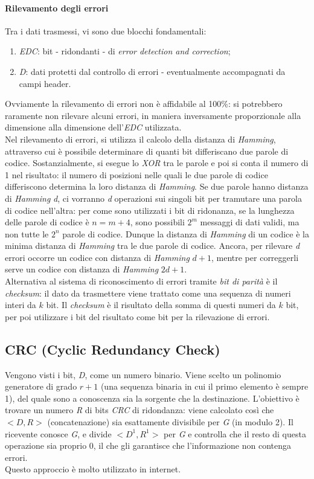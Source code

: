\paragraph{Rilevamento degli errori}
Tra i dati trasmessi, vi sono due blocchi fondamentali:
\begin{enumerate}
	\item \textit{EDC}: bit - ridondanti - di \textit{error detection and correction};
	\item \textit{D}: dati protetti dal controllo di errori - eventualmente accompagnati da campi header.
\end{enumerate}
Ovviamente la rilevamento di errori non è affidabile al 100\%: si potrebbero raramente non rilevare alcuni errori, in maniera inversamente proporzionale alla dimensione alla dimensione dell'\textit{EDC} utilizzata. \\
Nel rilevamento di errori, si utilizza il calcolo della distanza di \textit{Hamming}, attraverso cui è possibile determinare di quanti bit differiscano due parole di codice. Sostanzialmente, si esegue lo \textit{XOR} tra le parole e poi si conta il numero di 1 nel risultato: il numero di posizioni nelle quali le due parole di codice differiscono determina la loro distanza di \textit{Hamming}. Se due parole hanno distanza di \textit{Hamming} \textit{d}, ci vorranno \textit{d} operazioni sui singoli bit per tramutare una parola di codice nell'altra: per come sono utilizzati i bit di ridonanza, se la lunghezza delle parole di codice è $n=m+4$, sono possibili $2^m$ messaggi di dati validi, ma non tutte le $2^n$ parole di codice. Dunque la distanza di \textit{Hamming} di un codice è la minima distanza di \textit{Hamming} tra le due parole di codice. Ancora, per rilevare \textit{d} errori occorre un codice con distanza di \textit{Hamming} $d+1$, mentre per correggerli serve un codice con distanza di \textit{Hamming} $2d+1$. \\
Alternativa al sistema di riconoscimento di errori tramite \textit{bit di parità} è il \textit{checksum}: il dato da trasmettere viene trattato come una sequenza di numeri interi da $k$ bit. Il \textit{checksum} è il risultato della somma di questi numeri da $k$ bit, per poi utilizzare i bit del risultato come bit per la rilevazione di errori.

\subsection{CRC (Cyclic Redundancy Check)}
Vengono visti i bit, \textit{D}, come un numero binario. Viene scelto un polinomio generatore di grado $r+1$ (una sequenza binaria in cui il primo elemento è sempre 1), del quale sono a conoscenza sia la sorgente che la destinazione. L'obiettivo è trovare un numero \textit{R} di bits \textit{CRC} di ridondanza: viene calcolato così che $<D,R>$ (concatenazione) sia esattamente divisibile per \textit{G} (in modulo 2). Il ricevente conosce \textit{G}, e divide $<D^1,R^1>$ per \textit{G} e controlla che il resto di questa operazione sia proprio 0, il che gli garantisce che l'informazione non contenga errori. \\
Questo approccio è molto utilizzato in internet.


